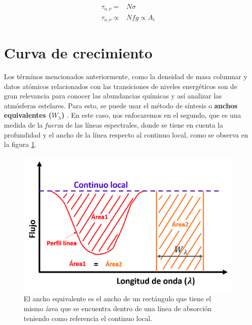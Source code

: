 \documentclass[12pt,oneside,openany,letter]{book}
\begin{document}
\begin{equation}
    \begin{array}{cc}
        \tau_{o, \nu} =& N \sigma \\
        \tau_{o, \nu} \propto& N fg \propto A_i
    \end{array}
    \label{ec:prof_opt}
\end{equation}

\section{Curva de crecimiento}\label{CoG}

Los términos mencionados anteriormente, como la densidad de masa columnar y datos atómicos relacionados con las transiciones de niveles energéticos son de gran relevancia para conocer las abundancias químicas y así analizar las atmósferas estelares. Para esto, se puede usar el método de síntesis o \textbf{anchos equivalentes ($W_{\lambda}$)} \citep{jofre2019accuracy}. En este caso, nos enfocaremos en el segundo, que es una medida de la \textit{fuerza} de las líneas espectrales, donde se tiene en cuenta la profundidad y el ancho de la línea respecto al continuo local, como se observa en la figura \ref{fig:ancho_eq}. 

\begin{figure}[h]
    \centering
    \includegraphics[width=0.6\linewidth]{Images/ew.png}
    \caption[Representación del ancho equivalente de una línea de absorción.]{El ancho equivalente es el ancho de un rectángulo que tiene el mismo área que se encuentra dentro de una línea de absorción teniendo como referencia el continuo local.}
    \label{fig:ancho_eq}
\end{figure}
\end{document}
